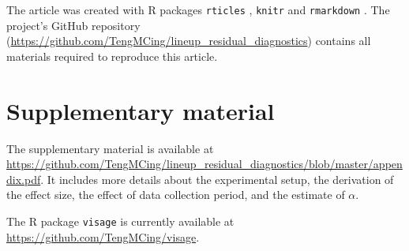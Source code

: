 \documentclass[]{interact}
\theoremstyle{plain}%
\theoremstyle{definition}
\theoremstyle{remark}
\begin{document}
The article was created with R packages \texttt{rticles}
\citep{rticles}, \texttt{knitr} \citep{knitr} and \texttt{rmarkdown}
\citep{rmarkdown}. The project's GitHub repository
(\url{https://github.com/TengMCing/lineup_residual_diagnostics})
contains all materials required to reproduce this article.

\hypertarget{supplementary-material}{%
\section*{Supplementary material}\label{supplementary-material}}

The supplementary material is available at
\url{https://github.com/TengMCing/lineup_residual_diagnostics/blob/master/appendix.pdf}.
It includes more details about the experimental setup, the derivation of
the effect size, the effect of data collection period, and the estimate
of \(\alpha\).

The R package \texttt{visage} is currently available at
\url{https://github.com/TengMCing/visage}.



\end{document}
